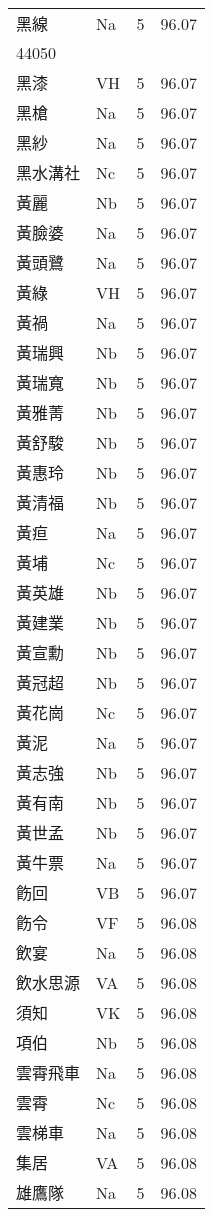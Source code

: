 \documentclass[twocolumn]{book}
\begin{document}
\begin{supertabular}{llrr}
黑線 & Na & 5 &  96.07\\
44050\\
黑漆 & VH & 5 &  96.07\\
黑槍 & Na & 5 &  96.07\\
黑紗 & Na & 5 &  96.07\\
黑水溝社 & Nc & 5 &  96.07\\
黃麗 & Nb & 5 &  96.07\\
黃臉婆 & Na & 5 &  96.07\\
黃頭鷺 & Na & 5 &  96.07\\
黃綠 & VH & 5 &  96.07\\
黃禍 & Na & 5 &  96.07\\
黃瑞興 & Nb & 5 &  96.07\\
黃瑞寬 & Nb & 5 &  96.07\\
黃雅菁 & Nb & 5 &  96.07\\
黃舒駿 & Nb & 5 &  96.07\\
黃惠玲 & Nb & 5 &  96.07\\
黃清福 & Nb & 5 &  96.07\\
黃疸 & Na & 5 &  96.07\\
黃埔 & Nc & 5 &  96.07\\
黃英雄 & Nb & 5 &  96.07\\
黃建業 & Nb & 5 &  96.07\\
黃宣勳 & Nb & 5 &  96.07\\
黃冠超 & Nb & 5 &  96.07\\
黃花崗 & Nc & 5 &  96.07\\
黃泥 & Na & 5 &  96.07\\
黃志強 & Nb & 5 &  96.07\\
黃有南 & Nb & 5 &  96.07\\
黃世孟 & Nb & 5 &  96.07\\
黃牛票 & Na & 5 &  96.07\\
飭回 & VB & 5 &  96.07\\
飭令 & VF & 5 &  96.08\\
飲宴 & Na & 5 &  96.08\\
飲水思源 & VA & 5 &  96.08\\
須知 & VK & 5 &  96.08\\
項伯 & Nb & 5 &  96.08\\
雲霄飛車 & Na & 5 &  96.08\\
雲霄 & Nc & 5 &  96.08\\
雲梯車 & Na & 5 &  96.08\\
集居 & VA & 5 &  96.08\\
雄鷹隊 & Na & 5 &  96.08\\

\end{supertabular}
\end{document}
